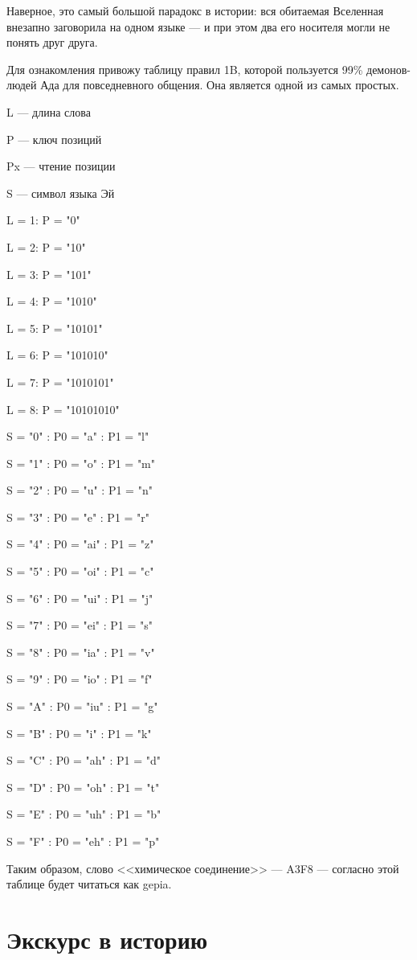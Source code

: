 \documentclass[a4paper,10pt]{book}
\begin{document}
Наверное, это самый большой парадокс в истории: вся обитаемая Вселенная 
внезапно заговорила на одном языке — и при этом два его носителя могли не 
понять друг друга.

Для ознакомления привожу таблицу правил 1B, которой пользуется 99\% 
демонов-людей Ада для повседневного общения. Она является одной из самых 
простых.

L --- длина слова

P --- ключ позиций

Px --- чтение позиции

S --- символ языка Эй

L = 1: P = "0"

L = 2: P = "10"

L = 3: P = "101"

L = 4: P = "1010"

L = 5: P = "10101"

L = 6: P = "101010"

L = 7: P = "1010101"

L = 8: P = "10101010"

S = "0" : P0 = "a" : P1 = "l"

S = "1" : P0 = "o" : P1 = "m"

S = "2" : P0 = "u" : P1 = "n"

S = "3" : P0 = "e" : P1 = "r"

S = "4" : P0 = "ai" : P1 = "z"

S = "5" : P0 = "oi" : P1 = "c"

S = "6" : P0 = "ui" : P1 = "j"

S = "7" : P0 = "ei" : P1 = "s"

S = "8" : P0 = "ia" : P1 = "v"

S = "9" : P0 = "io" : P1 = "f"

S = "A" : P0 = "iu" : P1 = "g"

S = "B" : P0 = "i" : P1 = "k"

S = "C" : P0 = "ah" : P1 = "d"

S = "D" : P0 = "oh" : P1 = "t"

S = "E" : P0 = "uh" : P1 = "b"

S = "F" : P0 = "eh" : P1 = "p"

Таким образом, слово <<химическое соединение>> --- A3F8 --- согласно этой 
таблице будет читаться как gepia.

\section{Экскурс в историю}
\end{document}
